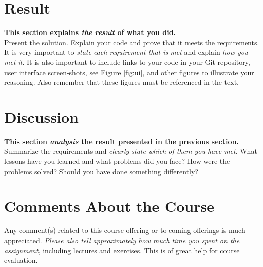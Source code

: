 \documentclass[a4paper]{scrartcl}
\begin{document}
\section{Result}

\textbf{This section explains \textit{the result} of what you did.} \\

\noindent Present the solution. Explain your code and prove that it meets the requirements. It is very important to \textit{state each requirement that is met} and explain \textit{how you met it}. It is also important to include links to your code in your Git repository, user interface screen-shots, see Figure \ref{fig:ui}, and other figures to illustrate your reasoning. Also remember that these figures must be referenced in the text.



\section{Discussion}

\textbf{This section \textit{analysis} the result presented in the previous section.} \\

\noindent Summarize the requirements and \textit{clearly state which of them you have met}. What lessons have you learned and what problems did you face? How were the problems solved? Should you have done something differently?

\section{Comments About the Course}

Any comment(s) related to this course offering or to coming offerings is much appreciated. \textit{Please also tell approximately how much time you spent on the assignment}, including lectures and exercises. This is of great help for course evaluation.

\printbibliography[heading=bibintoc]
\end{document}
